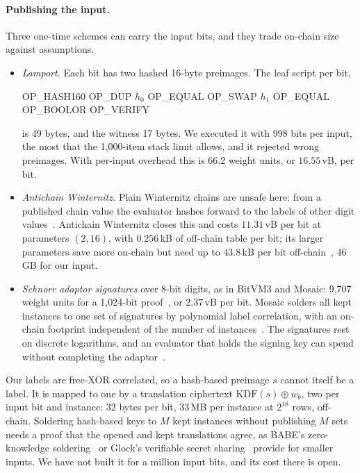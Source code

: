 \documentclass[11pt]{article}
\begin{document}
\paragraph{Publishing the input.} Three one-time schemes can carry the input
bits, and they trade on-chain size against assumptions.
\begin{itemize}
  \item \emph{Lamport.} Each bit has two hashed 16-byte preimages. The leaf script
    per bit,
    \begin{center}\ttfamily\small OP\_HASH160 OP\_DUP $h_0$ OP\_EQUAL OP\_SWAP $h_1$ OP\_EQUAL OP\_BOOLOR OP\_VERIFY\end{center}
    is 49 bytes, and the witness 17 bytes. We executed it with 998 bits per
    input, the most that the 1{,}000-item stack limit allows, and it rejected wrong
    preimages. With per-input overhead this is 66.2 weight units, or $16.55$\,vB,
    per bit.
  \item \emph{Antichain Winternitz.} Plain Winternitz chains are unsafe here: from
    a published chain value the evaluator hashes forward to the labels of other
    digit values~\cite{antichain26}. Antichain Winternitz closes this and costs
    $11.31$\,vB per bit at parameters $(2,16)$, with $0.256$\,kB of off-chain table
    per bit; its larger parameters save more on-chain but need up to
    $43.8$\,kB per bit off-chain~\cite{antichain26}, 46\,GB for our input.
  \item \emph{Schnorr adaptor signatures} over 8-bit digits, as in BitVM3 and
    Mosaic: 9{,}707 weight units for a 1{,}024-bit proof~\cite{bitvm3paper}, or
    $2.37$\,vB per bit. Mosaic solders all kept instances to one set of
    signatures by polynomial label correlation, with an on-chain footprint
    independent of the number of instances~\cite{mosaic26}. The signatures rest on
    discrete logarithms, and an evaluator that holds the signing key can spend
    without completing the adaptor~\cite{antichain26}.
\end{itemize}
Our labels are free-XOR correlated, so a hash-based preimage $s$ cannot itself be
a label. It is mapped to one by a translation ciphertext
$\mathrm{KDF}(s)\oplus w_b$, two per input bit and instance: 32 bytes per bit,
33\,MB per instance at $2^{18}$ rows, off-chain. Soldering hash-based keys to $M$
kept instances without publishing $M$ sets needs a proof that the opened and kept
translations agree, as BABE's zero-knowledge soldering~\cite{babe2026} or Glock's
verifiable secret sharing~\cite{eag25glock} provide for smaller inputs. We have not
built it for a million input bits, and its cost there is open.
\end{document}
